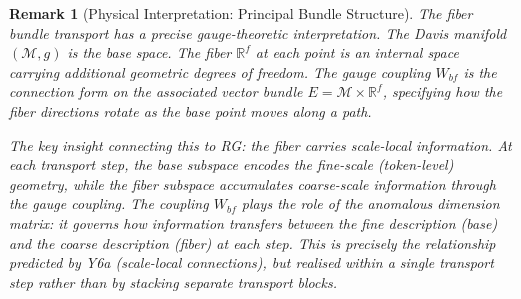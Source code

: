 \documentclass[11pt,letterpaper]{article}
\newtheorem{remark}[conjecture]{Remark}
\begin{document}
\begin{remark}[Physical Interpretation: Principal Bundle 
Structure]\label{rem:principal_bundle}
The fiber bundle transport has a precise gauge-theoretic 
interpretation. The Davis manifold $(\mathcal{M}, g)$ is the 
\emph{base space}. The fiber $\mathbb{R}^f$ at each point is an 
\emph{internal space} carrying additional geometric degrees of 
freedom. The gauge coupling $W_{bf}$ is the \emph{connection 
form} on the associated vector bundle 
$E = \mathcal{M} \times \mathbb{R}^f$, specifying how the fiber 
directions rotate as the base point moves along a path.

The key insight connecting this to RG: the fiber carries 
\emph{scale-local} information. At each transport step, the base 
subspace encodes the fine-scale (token-level) geometry, while the 
fiber subspace accumulates coarse-scale information through the 
gauge coupling. The coupling $W_{bf}$ plays the role of the 
\emph{anomalous dimension matrix}: it governs how information 
transfers between the fine description (base) and the coarse 
description (fiber) at each step. This is precisely the 
relationship predicted by Y6a (scale-local connections), but 
realised within a \emph{single} transport step rather than by 
stacking separate transport blocks.
\end{remark}
\end{document}

